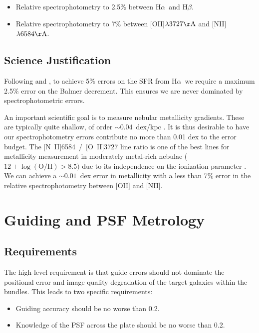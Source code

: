 \documentclass[preprint,11pt]{aastex}
\newcommand{\Halpha}{{H$\alpha$}}
\newcommand{\Hbeta}{{H$\beta$}}
\begin{document}
\begin{itemize}
\item Relative spectrophotometry to 2.5\% between \Halpha\ and \Hbeta.
\item Relative spectrophotometry to 7\% between [OII]$\lambda3727{\rm \AA}$ and [NII]$\lambda6584{\rm \AA}$. 
\end{itemize}

\subsection{Science Justification}

Following \citet{kennicutt1998} and \citet{calzetti01}, to achieve 5\%
errors on the SFR from \Halpha\ we require a maximum 2.5\% error on the Balmer
decrement. This ensures we are never dominated by spectrophotometric
errors.

An important scientific goal is to measure nebular metallicity
gradients. These are typically quite shallow, of order
$\sim0.04$~dex/kpc \citep{vanzee1996}. It is thus desirable to
have our spectrophotometry errors contribute no more than 0.01 dex to
the error budget. The [N~II]6584~/~[O~II]3727 line ratio is one of the
best lines for metallicity measurement in moderately metal-rich
nebulae ($12 + \log(\mathrm{O/H}) > 8.5)$ due to its independence on
the ionization parameter \citep{kewley02}. We can achieve a
$\sim0.01$~dex error in metallicity with a less than 7\% error in the relative
spectrophotometry between [OII] and [NII].

\section{Guiding and PSF Metrology} \label{sec:guiding}

\subsection{Requirements}

The high-level requirement is that guide errors should not dominate
the positional error and image quality degradation of the target
galaxies within the bundles. This leads to two specific requirements:

\begin{itemize}
\item Guiding accuracy should be no worse than 0.2\arcsec.
\item Knowledge of the PSF across the plate should be no worse than 0.2\arcsec.
\end{itemize}
\end{document}
